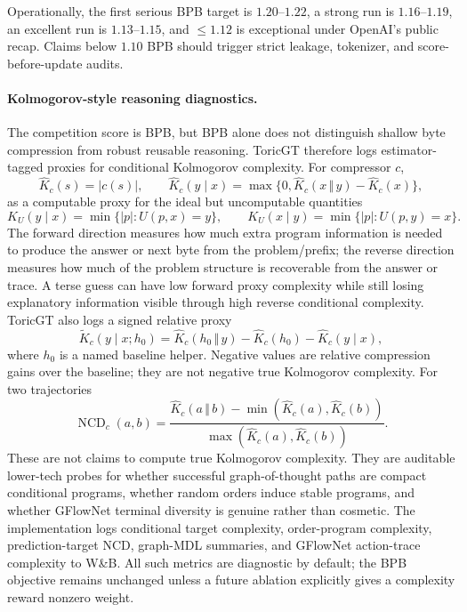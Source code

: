 \documentclass[10pt]{article}
\theoremstyle{definition}
\theoremstyle{plain}
\theoremstyle{remark}
\newcommand{\Kc}{\widehat K}
\begin{document}
Operationally, the first serious BPB target is $1.20$--$1.22$, a strong run is $1.16$--$1.19$, an excellent run is $1.13$--$1.15$, and $\le1.12$ is exceptional under OpenAI's public recap.  Claims below $1.10$ BPB should trigger strict leakage, tokenizer, and score-before-update audits.

\paragraph{Kolmogorov-style reasoning diagnostics.}
The competition score is BPB, but BPB alone does not distinguish shallow byte compression from robust reusable reasoning.  ToricGT therefore logs estimator-tagged proxies for conditional Kolmogorov complexity.  For compressor $c$,
\begin{equation}
  \Kc_c(s)=|c(s)|,\qquad
  \Kc_c(y\mid x)=\max\{0,\Kc_c(x\,\Vert\,y)-\Kc_c(x)\},
\end{equation}
as a computable proxy for the ideal but uncomputable quantities
\begin{equation}
  K_U(y\mid x)=\min\{|p|:U(p,x)=y\},\qquad
  K_U(x\mid y)=\min\{|p|:U(p,y)=x\}.
\end{equation}
The forward direction measures how much extra program information is needed to produce the answer or next byte from the problem/prefix; the reverse direction measures how much of the problem structure is recoverable from the answer or trace.  A terse guess can have low forward proxy complexity while still losing explanatory information visible through high reverse conditional complexity.  ToricGT also logs a signed relative proxy
\begin{equation}
  \widetilde K_c(y\mid x;h_0)=\Kc_c(h_0\,\Vert\,y)-\Kc_c(h_0)-\Kc_c(y\mid x),
\end{equation}
where $h_0$ is a named baseline helper.  Negative values are relative compression gains over the baseline; they are not negative true Kolmogorov complexity.  For two trajectories
\begin{equation}
  \operatorname{NCD}_c(a,b)=
  \frac{\Kc_c(a\,\Vert\,b)-\min(\Kc_c(a),\Kc_c(b))}
       {\max(\Kc_c(a),\Kc_c(b))}.
\end{equation}
These are not claims to compute true Kolmogorov complexity.  They are auditable lower-tech probes for whether successful graph-of-thought paths are compact conditional programs, whether random orders induce stable programs, and whether GFlowNet terminal diversity is genuine rather than cosmetic.  The implementation logs conditional target complexity, order-program complexity, prediction-target NCD, graph-MDL summaries, and GFlowNet action-trace complexity to W\&B.  All such metrics are diagnostic by default; the BPB objective remains unchanged unless a future ablation explicitly gives a complexity reward nonzero weight.
\end{document}

